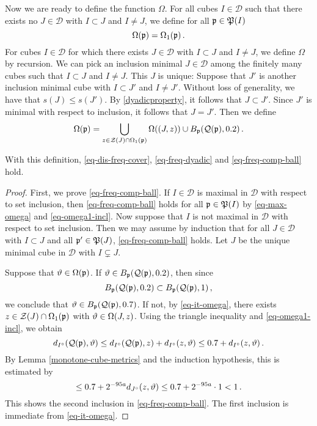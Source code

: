 {Now we are ready to define the function $\Omega$. For all cubes $I \in \mathcal{D}$ such that there exists no $J \in \mathcal{D}$ with $I \subset J$ and $I \ne J$, we define for all ${\mathfrak p} \in {\mathfrak P}(I)$
\begin{equation}
    \label{eq-max-omega}
    {\Omega}({\mathfrak p}) = \Omega_1({\mathfrak p})\,.
\end{equation}
For cubes $I \in \mathcal{D}$ for which there exists $J \in \mathcal{D}$ with $I \subset J$ and $I \ne J$, we define $\Omega$ by recursion. We can pick an inclusion minimal $J \in \mathcal{D}$ among the finitely many cubes such that $I \subset J$ and $I \ne J$. This $J$ is unique: Suppose that $J'$ is another inclusion minimal cube with $I \subset J'$ and $I \ne J'$. Without loss of generality, we have that $s(J) \le s(J')$. By \eqref{dyadicproperty}, it follows that $J \subset J'$. Since $J'$ is minimal with respect to inclusion, it follows that $J = J'$.  Then we define
\begin{equation}
    \label{eq-it-omega}
    {\Omega}({\mathfrak p}) = \bigcup_{z \in \mathcal{Z}(J) \cap \Omega_1({\mathfrak p})} \Omega((J, z)) \cup B_{{\mathfrak p}}({\mathcal{Q}}({\mathfrak p}),0.2)\,.
\end{equation}

\begin{lemma}
\label{dyadic-frequency-cubes}
    With this definition, \eqref{eq-dis-freq-cover}, \eqref{eq-freq-dyadic} and \eqref{eq-freq-comp-ball} hold.
\end{lemma}

\begin{proof}
    First, we prove \eqref{eq-freq-comp-ball}. If $I \in \mathcal{D}$ is maximal in $\mathcal{D}$ with respect to set inclusion, then \eqref{eq-freq-comp-ball} holds for all ${\mathfrak p} \in {\mathfrak P}(I)$ by \eqref{eq-max-omega} and \eqref{eq-omega1-incl}. Now suppose that $I$ is not maximal in $\mathcal{D}$ with respect to set inclusion. Then we may assume by induction that for all $J \in \mathcal{D}$ with $I \subset J$ and all ${\mathfrak p}' \in {\mathfrak P}(J)$, \eqref{eq-freq-comp-ball} holds. Let $J$ be the unique minimal cube in $\mathcal{D}$ with $I \subsetneq J$.

    Suppose that ${\vartheta} \in \Omega({\mathfrak p})$. If ${\vartheta}\in B_{{\mathfrak p}}(\mathcal{Q}({\mathfrak p}), 0.2)$, then since
    \begin{equation*}
        B_{{\mathfrak p}}(\mathcal{Q}({\mathfrak p}), 0.2)\subset B_{{\mathfrak p}}(\mathcal{Q}({\mathfrak p}), 1)\, ,
    \end{equation*}
    we conclude that ${\vartheta}\in B_{{\mathfrak p}}(\mathcal{Q}({\mathfrak p}), 0.7)$. If not, by \eqref{eq-it-omega}, there exists $z \in \mathcal{Z}(J) \cap \Omega_1({\mathfrak p})$ with ${\vartheta} \in \Omega(J,z)$. Using the triangle inequality and \eqref{eq-omega1-incl}, we obtain
    $$
        d_{I^\circ}({\mathcal{Q}}({\mathfrak p}),{\vartheta}) \le d_{I^\circ}({\mathcal{Q}}({\mathfrak p}), z) + d_{I^\circ}(z, {\vartheta}) \le 0.7 + d_{I^\circ}(z, {\vartheta})\,.
    $$
    By Lemma \ref{monotone-cube-metrics} and the induction hypothesis, this is estimated by
    $$
        \le 0.7 + 2^{-95a} d_{J^\circ}(z,{\vartheta}) \le 0.7 + 2^{-95a}\cdot 1 < 1\,.
    $$
    This shows the second inclusion in \eqref{eq-freq-comp-ball}. The first inclusion is immediate from \eqref{eq-it-omega}.


\end{proof}}
